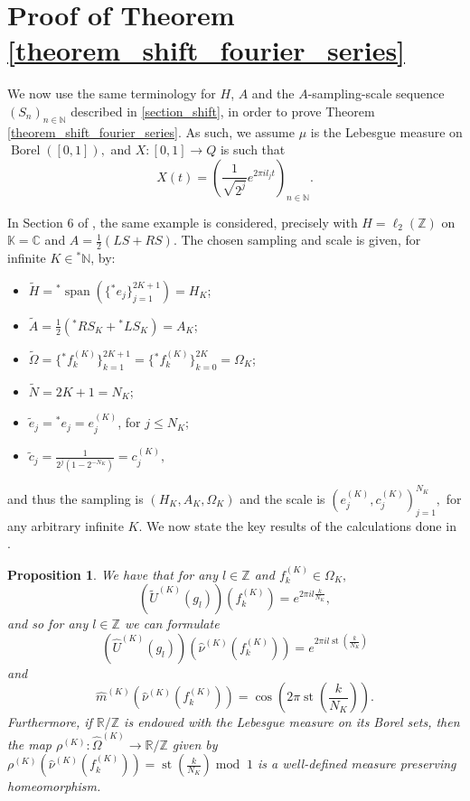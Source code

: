 \documentclass[10pt,a4paper]{amsart}
\newtheorem{prop}[thm]{Proposition}
\def \Span{\operatorname{span}}
\def \St{\operatorname{st}}
\def \Borel{\operatorname{Borel}}
\def \HOM{\hat{\Omega}}
\def \HNU{\hat{\nu}}
\def \HU{\hat{U}}
\def \Hm{\hat{m}}
\begin{document}
\section{Proof of Theorem \ref{theorem_shift_fourier_series} }\label{appendix_shift}

We now use the same terminology for $H$, $A$ and the $A$-sampling-scale sequence $(S_n)_{n\in\mathbb{N}}$ described in \ref{section_shift}, in order to prove Theorem \ref{theorem_shift_fourier_series}. As such, we assume $\mu$ is the Lebesgue measure on $\Borel([0,1]),$ and $X:[0,1]\rightarrow Q$ is such that $$X(t)=\left(\frac{1}{\sqrt{2^j}}e^{2\pi i l_j t}\right)_{n\in\mathbb{N}}.$$

In Section 6 of \cite{nonez2024spectralequivalencesnonstandardsamplings}, the same example is considered, precisely with $H=\ell_2(\mathbb{Z})$ on $\mathbb{K}=\mathbb{C}$ and $A=\frac{1}{2}(LS+RS)$. The chosen sampling and scale is given, for infinite $K\in{}^*\mathbb{N}$, by:
\begin{itemize}
	\item $\tilde{H}={}^*\Span(\{{}^*e_j \}_{j=1}^{2K+1})=H_K$;
	\item $\tilde{A}=\frac{1}{2}({}^*RS_K+{}^*LS_K)=A_K$;
	\item $\tilde{\Omega}=\{{}^*f_k^{(K)} \}_{k=1}^{2K+1}=\{{}^*f_k^{(K)} \}_{k=0}^{2K}=\Omega_K$;
	\item $\tilde{N}=2K+1=N_K$;
	\item $\tilde{e}_j= {}^*e_j= e_j^{(K)}$, for $j\leq N_K$;
	\item $\tilde{c}_j=\frac{1}{2^j(1-2^{-N_K})}=c_j^{(K)},$
\end{itemize}
and thus the sampling is $(H_K,A_K,\Omega_K)$ and the scale is $(e_j^{(K)},c_j^{(K)})_{j=1}^{N_K},$ for any arbitrary infinite $K$. We now state the key results of the calculations done in \cite{nonez2024spectralequivalencesnonstandardsamplings}.

\begin{prop}
	We have that for any $l\in\mathbb{Z}$ and $f_k^{(K)}\in \Omega_K,$ $$(\tilde{U}^{(K)}(g_l))(f_k^{(K)})=e^{2\pi i l\frac{k}{N_K}},$$ and so for any $l\in\mathbb{Z}$ we can formulate $$(\HU^{(K)}(g_l))(\HNU^{(K)}(f_k^{(K)}))=e^{2\pi i l \St(\frac{k}{N_K})}$$ and $$\Hm^{(K)}(\HNU^{(K)}(f_k^{(K)}))=\cos(2\pi\St(\frac{k}{N_K})).$$
	Furthermore, if $\mathbb{R}/\mathbb{Z}$ is endowed with the Lebesgue measure on its Borel sets, then the map $\rho^{(K)}:\HOM^{(K)}\rightarrow \mathbb{R}/\mathbb{Z}$ given by $\rho^{(K)}(\HNU^{(K)}(f_k^{(K)}))=\St(\frac{k}{N_K}) \operatorname{mod}\;1$ is a well-defined measure preserving homeomorphism.
\end{prop}
\end{document}
